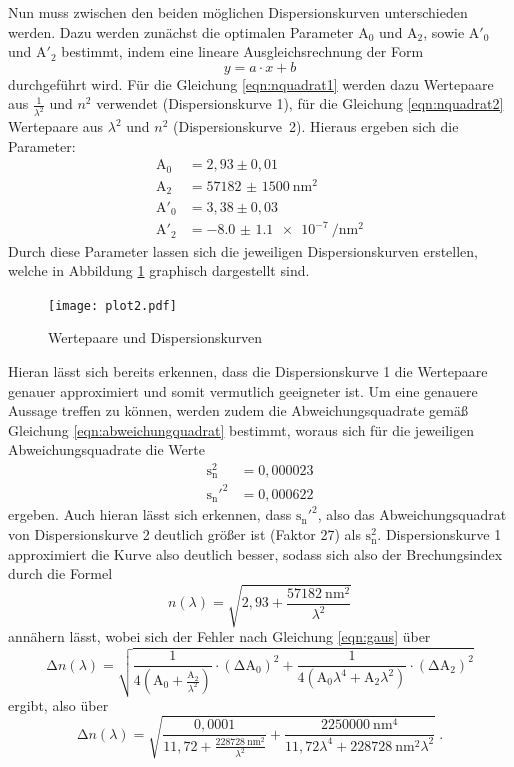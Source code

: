 Nun muss zwischen den beiden möglichen Dispersionskurven unterschieden werden.
Dazu werden zunächst die optimalen Parameter $\text{A}_0$ und $\text{A}_2$, sowie
$\text{A}'_0$ und $\text{A}'_2$
bestimmt, indem eine lineare Ausgleichsrechnung der Form
\begin{equation}
  y = a\cdot x +b
  \label{eqn:linear}
\end{equation}
durchgeführt wird. Für die Gleichung \ref{eqn:nquadrat1} werden dazu Wertepaare aus $\frac{1}{\lambda^2}$
und $n^2$ verwendet (Dispersionskurve 1), für die Gleichung \ref{eqn:nquadrat2} Wertepaare aus $\lambda^2$
und $n^2$ (Dispersionskurve~2).
Hieraus ergeben sich die Parameter:
\begin{align*}
  \text{A}_0 &= 2,93 \pm 0,01 \\
  \text{A}_2 &= \SI{57182(1500)}{\nano\meter\squared} \\
  \text{A}'_0 &= 3,38 \pm 0,03 \\
  \text{A}'_2 &= \SI{-8.0(11)e-7}{\per\nano\meter\squared}
\end{align*}
Durch diese Parameter lassen sich die jeweiligen Dispersionskurven erstellen, welche in Abbildung
\ref{fig:plot2} graphisch dargestellt sind.
\begin{figure}[H]
  \centering
  \texttt{[image: plot2.pdf]}
  \caption{Wertepaare und Dispersionskurven}
  \label{fig:plot2}
\end{figure}
Hieran lässt sich bereits erkennen, dass die Dispersionskurve 1 die Wertepaare genauer
approximiert und somit vermutlich geeigneter ist.
Um eine genauere Aussage treffen zu können, werden zudem die Abweichungsquadrate gemäß
Gleichung \ref{eqn:abweichungquadrat} bestimmt, woraus sich für die jeweiligen Abweichungsquadrate
die Werte
\begin{align*}
  \text{s}_{\text{n}}^2 &= 0,000023 \\
  \text{s}_{\text{n}}'^2 &= 0,000622
\end{align*}
ergeben.
Auch hieran lässt sich erkennen, dass $\text{s}_{\text{n}}'^2$, also das Abweichungsquadrat
von Dispersionskurve 2 deutlich größer ist (Faktor 27) als $\text{s}_{\text{n}}^2$.
Dispersionskurve 1 approximiert die Kurve also deutlich besser, sodass sich also
der Brechungsindex durch die Formel
\begin{equation}
  n(\lambda) = \sqrt{2,93 + \frac{\SI{57182}{\nano\meter\squared}}{{\lambda}^2}}
  \label{eqn:brech}
\end{equation}
annähern lässt, wobei sich der Fehler nach Gleichung \ref{eqn:gaus} über
\begin{equation}
    \increment n(\lambda) = \sqrt{\frac{1}{4(\text{A}_0+\frac{\text{A}_2}{{\lambda}^2})}
    \cdot (\increment \text{A}_0)^2
    + \frac{1}{4(\text{A}_0 {\lambda}^4 +\text{A}_2{\lambda}^2)}
    \cdot (\increment \text{A}_2)^2}
\end{equation}
ergibt, also über
\begin{equation}
    \increment n(\lambda) = \sqrt{\frac{0,0001}{11,72+\frac{\SI{228728}{\nano\meter\squared}}{{\lambda}^2}}
    + \frac{\SI{2250000}{\nano\meter^4}}{11,72 {\lambda}^4 +\SI{228728}{\nano\meter\squared}{\lambda}^2}} \: .
\end{equation}

